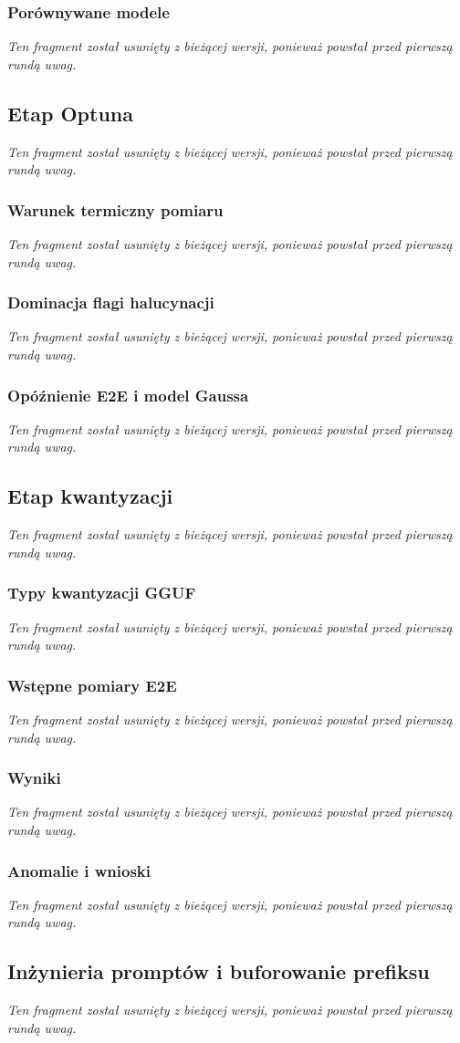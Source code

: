 \documentclass[
    a4paper,
    left=25mm,
    right=25mm,
    top=25mm,
    bottom=25mm,
    bindingoffset=5mm,
    nohyphenation=false
]{src/wut-thesis}
\newcommand{\nieredagowane}{%
\textit{Ten fragment został usunięty z bieżącej wersji, ponieważ powstał przed pierwszą rundą uwag.}%
}
\begin{document}
\subsubsection{Porównywane modele}
\nieredagowane

\subsection{Etap Optuna}
\nieredagowane

\subsubsection{Warunek termiczny pomiaru}
\nieredagowane

\subsubsection{Dominacja flagi halucynacji}
\nieredagowane

\subsubsection{Opóźnienie E2E i model Gaussa}
\nieredagowane

\subsection{Etap kwantyzacji}
\nieredagowane

\subsubsection{Typy kwantyzacji GGUF}
\nieredagowane

\subsubsection{Wstępne pomiary E2E}
\nieredagowane

\subsubsection{Wyniki}
\nieredagowane

\subsubsection{Anomalie i wnioski}
\nieredagowane

\subsection{Inżynieria promptów i buforowanie prefiksu}
\nieredagowane
\end{document}
